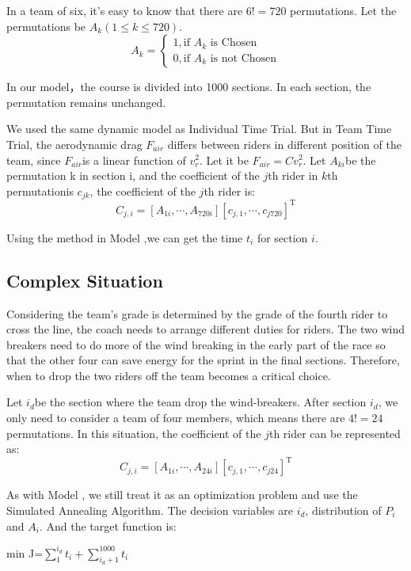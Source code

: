 \documentclass{mcmthesis}
\begin{document}
In a team of six, it's easy to know that there are $6!=720$ permutations. Let the permutations be $A_k (1\leq k\leq 720)$.
\begin{equation}
	A_k=\begin{cases}
		1,\text{if $A_k$ is Chosen}\\
		0,\text{if $A_k$ is not Chosen}
	\end{cases}
\end{equation}

In our model，the course is divided into 1000 sections. In each section, the permutation remains unchanged. 

We used the same dynamic model as Individual Time Trial. But in Team Time Trial, the aerodynamic drag $F_{air}$ differs between riders in different position of the team, since $F_{air}$is a linear function of $v_r^2$. Let it be $F_{air}=Cv_r^2$. Let $A_{ki}$be the permutation k in section i, and the coefficient of the $j$th rider in $k$th permutationis $c_{jk}$, the coefficient of the $j$th rider is:
\begin{equation}
	C_{j,i}=[A_{1i},\cdots,A_{720i}][c_{j,1},\cdots,c_{j720}]^\mathrm{T}
\end{equation}

Using the method in Model \uppercase\expandafter{},we can get the time $t_i$ for section $i$.

\subsection{Complex Situation}
Considering the team’s grade is determined by the grade of the fourth rider to cross the line, the coach needs to arrange different duties for riders. The two wind breakers need to do more of the wind breaking in the early part of the race so that the other four can save energy for the sprint in the final sections. Therefore, when to drop the two riders off the team becomes a critical choice.

Let $i_d$be the section where the team drop the wind-breakers.  After section $i_d$, we only need to consider a team of four members, which means there are $4!=24$ permutations. In this situation, the coefficient of the $j$th rider can be represented as:
\begin{equation}
	C_{j,i}=[A_{1i},\cdots,A_{24i}][c_{j,1},\cdots,c_{j24}]^\mathrm{T}
\end{equation}

As with Model \uppercase\expandafter{}, we still treat it as an optimization problem and use the Simulated Annealing Algorithm. The decision variables are $i_d$, distribution of $P_i$ and $A_i$. And the target function is:
\begin{center}
	min J=$\sum_{1}^{i_d}t_i+\sum_{i_d+1}^{1000}t_i$
\end{center}
\end{document}
